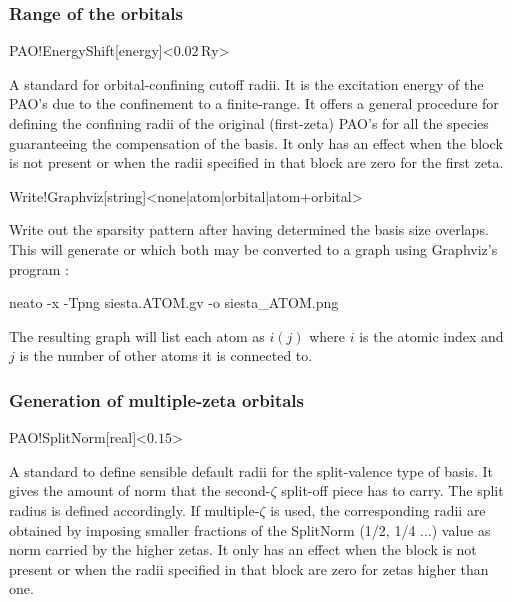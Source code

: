 \subsubsection{Range of the orbitals}

\begin{fdfentry}{PAO!EnergyShift}[energy]<$0.02\,\mathrm{Ry}$>

  A standard for orbital-confining cutoff radii. It is the excitation
  energy of the PAO's due to the confinement to a finite-range. It
  offers a general procedure for defining the confining radii of the
  original (first-zeta) PAO's for all the species guaranteeing the
  compensation of the basis. It only has an effect when the block
   is not present or when the radii specified in
  that block are zero for the first zeta.

\end{fdfentry}  


\begin{fdfentry}{Write!Graphviz}[string]<none|atom|orbital|atom+orbital>

  Write out the sparsity pattern after having determined the basis
  size overlaps. This will generate  or
   which both may be converted to a graph using
  Graphviz's program :
  \begin{shellexample}
    neato -x -Tpng siesta.ATOM.gv -o siesta_ATOM.png
  \end{shellexample}
  The resulting graph will list each atom as $i (j)$ where $i$ is the
  atomic index and $j$ is the number of other atoms it is connected
  to.

\end{fdfentry}


\subsubsection{Generation of multiple-zeta orbitals}

\begin{fdfentry}{PAO!SplitNorm}[real]<$0.15$>

  A standard to define sensible default radii for the split-valence
  type of basis. It gives the amount of norm that the second-$\zeta$
  split-off piece has to carry. The split radius is defined
  accordingly. If multiple-$\zeta$ is used,
  the corresponding radii are obtained by imposing smaller fractions
  of the SplitNorm (1/2, 1/4 ...) value as norm carried by the higher
  zetas. It only has an effect when the block  is
  not present or when the radii specified in that block are zero for
  zetas higher than one.
  
\end{fdfentry}

